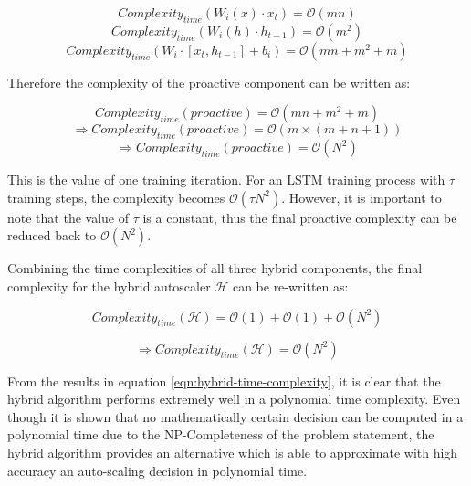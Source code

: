 \[Complexity_{time}(W_{i}(x) \cdot x_{t}) = \mathcal{O}(mn)\]
\[Complexity_{time}(W_{i}(h) \cdot h_{t-1}) = \mathcal{O}(m^2)\]
\begin{equation}
    Complexity_{time}(W_{i} \cdot [x_{t}, h_{t-1}] + b_{i}) = \mathcal{O}(mn + m^2 + m)
\end{equation}

Therefore the complexity of the proactive component can be written as:

\[Complexity_{time}(proactive) = \mathcal{O}(mn + m^2 + m)\]
\[\Rightarrow Complexity_{time}(proactive) = \mathcal{O}(m \times (m + n + 1))\]
\begin{equation}
    \Rightarrow Complexity_{time}(proactive) = \mathcal{O}(N^2)
\end{equation}

This is the value of one training iteration. For an LSTM training process with $\tau$ training steps, the complexity becomes $\mathcal{O}(\tau N^2)$. However, it is important to note that the value of $\tau$ is a constant, thus the final proactive complexity can be reduced back to $\mathcal{O}(N^2)$.\par

Combining the time complexities of all three hybrid components, the final complexity for the hybrid autoscaler $\mathcal{H}$ can be re-written as:

\[Complexity_{time}(\mathcal{H}) = \mathcal{O}(1) +  \mathcal{O}(1) + \mathcal{O}(N^2)\]

\begin{equation}
    \label{eqn:hybrid-time-complexity}
    \Rightarrow Complexity_{time}(\mathcal{H}) = \mathcal{O}(N^2)
\end{equation}

From the results in equation \ref{eqn:hybrid-time-complexity}, it is clear that the hybrid algorithm performs extremely well in a polynomial time complexity. Even though it is shown that no mathematically certain decision can be computed in a polynomial time due to the NP-Completeness of the problem statement, the hybrid algorithm provides an alternative which is able to approximate with high accuracy an auto-scaling decision in polynomial time.